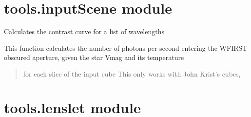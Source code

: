 \documentclass[letterpaper,10pt,english]{sphinxmanual}
\begin{document}
\section{tools.inputScene module}
\label{tools:module-tools.inputScene}\label{tools:tools-inputscene-module}

\begin{fulllineitems}
\label{tools:tools.inputScene.calc_contrast}
Calculates the contrast curve for a list of wavelengths

\end{fulllineitems}


\begin{fulllineitems}
\label{tools:tools.inputScene.convert_krist_cube}
This function calculates the number of photons per second
entering the WFIRST obscured aperture, given the star Vmag and its temperature
\begin{quote}

for each slice of the input cube
This only works with John Krist's cubes,
\end{quote}

\end{fulllineitems}



\section{tools.lenslet module}
\label{tools:module-tools.lenslet}\label{tools:tools-lenslet-module}
\end{document}
